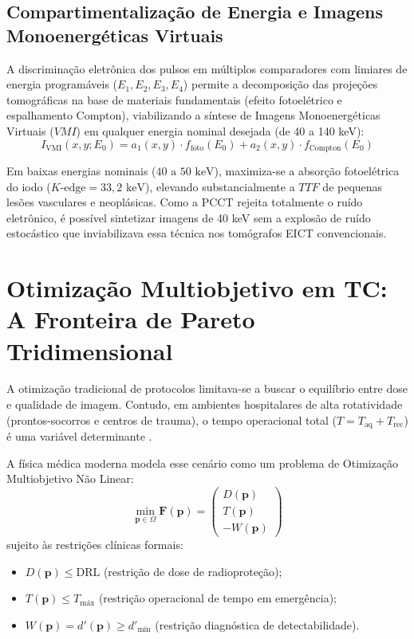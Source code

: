 \subsection{Compartimentalização de Energia e Imagens Monoenergéticas Virtuais}
A discriminação eletrônica dos pulsos em múltiplos comparadores com limiares de energia programáveis ($E_1, E_2, E_3, E_4$) permite a decomposição das projeções tomográficas na base de materiais fundamentais (efeito fotoelétrico e espalhamento Compton), viabilizando a síntese de Imagens Monoenergéticas Virtuais ($VMI$) em qualquer energia nominal desejada (de 40 a 140 keV):
\begin{equation}
  I_{\text{VMI}}(x, y; E_0) = a_1(x, y) \cdot f_{\text{foto}}(E_0) + a_2(x, y) \cdot f_{\text{Compton}}(E_0)
  \label{eq:vmi_formula}
\end{equation}

Em baixas energias nominais ($40 \text{ a } 50 \text{ keV}$), maximiza-se a absorção fotoelétrica do iodo ($K\text{-edge} = 33{,}2 \text{ keV}$), elevando substancialmente a $TTF$ de pequenas lesões vasculares e neoplásicas. Como a PCCT rejeita totalmente o ruído eletrônico, é possível sintetizar imagens de 40 keV sem a explosão de ruído estocástico que inviabilizava essa técnica nos tomógrafos EICT convencionais.

\section{Otimização Multiobjetivo em TC: A Fronteira de Pareto Tridimensional}
\label{sec:pareto_otimizacao}

A otimização tradicional de protocolos limitava-se a buscar o equilíbrio entre dose e qualidade de imagem. Contudo, em ambientes hospitalares de alta rotatividade (prontos-socorros e centros de trauma), o tempo operacional total ($T = T_{\text{aq}} + T_{\text{rec}}$) é uma variável determinante \cite{oostveen2021}.

A física médica moderna modela esse cenário como um problema de Otimização Multiobjetivo Não Linear:
\begin{equation}
  \min_{\mathbf{p} \in \Omega} \mathbf{F}(\mathbf{p}) = \begin{pmatrix} D(\mathbf{p}) \\ T(\mathbf{p}) \\ -W(\mathbf{p}) \end{pmatrix}
  \label{eq:multiobjetivo_pareto}
\end{equation}
sujeito às restrições clínicas formais:
\begin{itemize}
  \item $D(\mathbf{p}) \le \text{DRL}$ (restrição de dose de radioproteção);
  \item $T(\mathbf{p}) \le T_{\text{máx}}$ (restrição operacional de tempo em emergência);
  \item $W(\mathbf{p}) = d'(\mathbf{p}) \ge d'_{\text{mín}}$ (restrição diagnóstica de detectabilidade).
\end{itemize}

